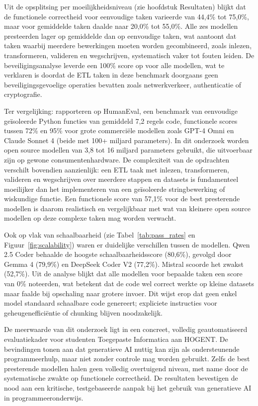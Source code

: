 Uit de opsplitsing per moeilijkheidsniveau (zie hoofdstuk Resultaten) blijkt dat de functionele correctheid voor eenvoudige taken varieerde van 44,4\% tot 75,0\%, maar voor gemiddelde taken daalde naar 20,0\% tot 55,0\%. Alle zes modellen presteerden lager op gemiddelde dan op eenvoudige taken, wat aantoont dat taken waarbij meerdere bewerkingen moeten worden gecombineerd, zoals inlezen, transformeren, valideren en wegschrijven, systematisch vaker tot fouten leiden. De beveiligingsanalyse leverde een 100\% score op voor alle modellen, wat te verklaren is doordat de ETL taken in deze benchmark doorgaans geen beveiligingsgevoelige operaties bevatten zoals netwerkverkeer, authenticatie of cryptografie.

Ter vergelijking: \textcite{Bayram2025} rapporteren op HumanEval, een benchmark van eenvoudige ge\"isoleerde Python functies van gemiddeld 7,2 regels code, functionele scores tussen 72\% en 95\% voor grote commerci\"ele modellen zoals GPT-4 Omni en Claude Sonnet 4 (beide met 100+ miljard parameters). In dit onderzoek worden open source modellen van 3,8 tot 16 miljard parameters gebruikt, die uitvoerbaar zijn op gewone consumentenhardware. De complexiteit van de opdrachten verschilt bovendien aanzienlijk: een ETL taak met inlezen, transformeren, valideren en wegschrijven over meerdere stappen en datasets is fundamenteel moeilijker dan het implementeren van een ge\"isoleerde stringbewerking of wiskundige functie. Een functionele score van 57,1\% voor de best presterende modellen is daarom realistisch en vergelijkbaar met wat van kleinere open source modellen op deze complexe taken mag worden verwacht.

Ook op vlak van schaalbaarheid (zie Tabel~\ref{tab:pass_rates} en Figuur~\ref{fig:scalability}) waren er duidelijke verschillen tussen de modellen. Qwen 2.5 Coder behaalde de hoogste schaalbaarheidsscore (80,6\%), gevolgd door Gemma 4 (79,9\%) en DeepSeek Coder V2 (77,2\%). Mistral scoorde het zwakst (52,7\%). Uit de analyse blijkt dat alle modellen voor bepaalde taken een score van 0\% noteerden, wat betekent dat de code wel correct werkte op kleine datasets maar faalde bij opschaling naar grotere invoer. Dit wijst erop dat geen enkel model standaard schaalbare code genereert; expliciete instructies voor geheugenefficiëntie of chunking blijven noodzakelijk.

De meerwaarde van dit onderzoek ligt in een concreet, volledig geautomatiseerd evaluatiekader voor studenten Toegepaste Informatica aan HOGENT. De bevindingen tonen aan dat generatieve AI nuttig kan zijn als ondersteunende programmeerhulp, maar niet zonder controle mag worden gebruikt. Zelfs de best presterende modellen halen geen volledig overtuigend niveau, met name door de systematische zwakte op functionele correctheid. De resultaten bevestigen de nood aan een kritische, testgebaseerde aanpak bij het gebruik van generatieve AI in programmeeronderwijs.

